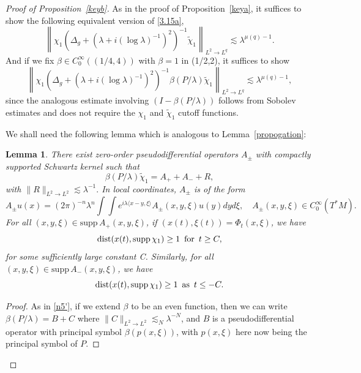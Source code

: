 \documentclass[10pt]{amsart}
\newtheorem{lemma}[theorem]{Lemma}
\newcommand{\la}{\lambda}
\newcommand{\supp}{\mathrm{supp }}
\newcommand{\1}{{\bf 1}}
\newcommand{\dist}{{{\rm dist}}}
\begin{document}
\begin{proof}[Proof of Proposition~\ref{keyb}]
As in the proof of Proposition~\ref{keya}, it suffices to show the following equivalent version of \eqref{3.15a},
\begin{equation}\label{main}
    \left\|\chi_1\left(\Delta_g+(\la+i(\log\la)^{-1})^2\right)^{-1}\tilde\chi_1\right\|_{L^2\to L^q}\lesssim \la^{\mu(q)-1}.
\end{equation}
And if we fix $\beta \in C^\infty_0((1/4,4))$ with $\beta= 1$ in (1/2,2), it suffices to show 
\begin{equation}\label{p2.5}
    \left\|\chi_1\left(\Delta_g+(\la+i(\log\la)^{-1})^2\right)^{-1}\beta(P/\la)\tilde\chi_1\right\|_{L^2\to L^q}\lesssim \la^{\mu(q)-1},
\end{equation}
since the analogous estimate involving $(I-\beta(P/\la))$
follows from Sobolev estimates and does not require the $\chi_1$ and $\tilde\chi_1$ cutoff functions.


 We shall need the following lemma which is analogous to Lemma~\ref{propogation}:
\begin{lemma}
    There exist zero-order pseudodifferential operators $A_\pm$ {with compactly supported Schwartz kernel} such that 
{
\begin{equation}\label{eq:lem2.8}
\beta(P/\la)\tilde\chi_1=A_++ A_-+R,
\end{equation} 
}with
$ \|R\|_{L^2\to L^2}\lesssim\la^{-1}.
$
{In local coordinates, $A_{\pm}$ is of the form
\begin{equation}
    A_{\pm} u(x) = (2\pi)^{-n}\la^n\int\int e^{i\la\langle x-y,\xi \rangle} A_{\pm}(x,y,\xi)u(y) dyd\xi,\quad A_{\pm}(x,y,\xi) \in C_0^{\infty}(T^*M).
\end{equation}
}
For all $(x,y,\xi)\in \supp\, A_+(x, y,\xi)$, if $(x(t),\xi(t))=\Phi_t(x,\xi)$, we have 
\begin{equation}\label{6a}
   \dist( x(t), \supp\,\chi_1)\ge 1  \,\,\,\text{for}\,\,\,t \ge C,
\end{equation}
for some sufficiently large constant C. Similarly, for all $(x, y,\xi)\in \supp\, A_-(x,y,\xi)$,  we have 
\begin{equation}\label{7a}
   \dist( x(t), \supp\,\chi_1)\ge 1 \,\,\,\text{as}\,\,\,t\le -C.
\end{equation}
\end{lemma}
\begin{proof}
{{
As in \eqref{n5'}, if we extend $\beta$ to be an even function, then we can write $\beta(P/\la)=B+C$ where $ \|C\|_{L^2\to L^2}\lesssim_N \la^{-N}$, and $B$ is a pseudodifferential operator with principal symbol $\beta(p(x,\xi))$,
with $p(x,\xi)$ here now being the principal symbol of $P$. 

}}
\end{proof}
\end{proof}
\end{document}
